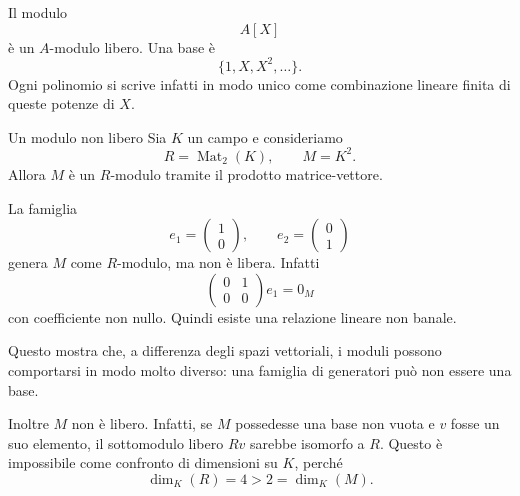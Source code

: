 \documentclass[a4paper]{article}
\begin{document}
\begin{radioactive}
\begin{snippetexample}{}
    Il modulo
    \[
        A[X]
    \]
    è un \(A\)-modulo libero. Una base è
    \[
        \{1,X,X^2,\ldots\}.
    \]
    Ogni polinomio si scrive infatti in modo unico come combinazione lineare finita di queste potenze di \(X\).
\end{snippetexample}
\end{radioactive}

\begin{radioactive}
\begin{snippetexample}{Un modulo non libero}
    Sia \(K\) un campo e consideriamo
    \[
        R=\operatorname{Mat}_2(K),
        \qquad
        M=K^2.
    \]
    Allora \(M\) è un \(R\)-modulo tramite il prodotto matrice-vettore.

    La famiglia
    \[
        e_1=
        \begin{pmatrix}
            1\\
            0
        \end{pmatrix},
        \qquad
        e_2=
        \begin{pmatrix}
            0\\
            1
        \end{pmatrix}
    \]
    genera \(M\) come \(R\)-modulo, ma non è libera. Infatti
    \[
        \begin{pmatrix}
            0 & 1\\
            0 & 0
        \end{pmatrix}e_1
        =
        0_M
    \]
    con coefficiente non nullo. Quindi esiste una relazione lineare non banale.

    Questo mostra che, a differenza degli spazi vettoriali, i moduli possono comportarsi in modo molto diverso: una famiglia di generatori può non essere una base.

    Inoltre \(M\) non è libero. Infatti, se \(M\) possedesse una base non vuota e \(v\) fosse un suo elemento, il sottomodulo libero \(Rv\) sarebbe isomorfo a \(R\). Questo è impossibile come confronto di dimensioni su \(K\), perché
    \[
        \dim_K(R)=4>2=\dim_K(M).
    \]
\end{snippetexample}
\end{radioactive}

\pagebreak
\end{document}
